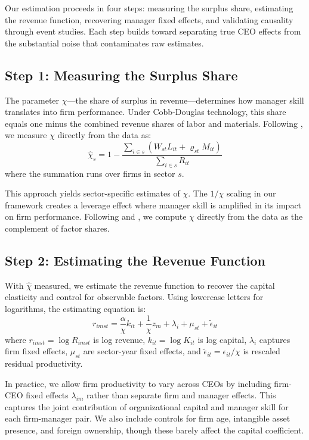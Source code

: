 \documentclass[11pt,a4paper]{article}
\begin{document}
Our estimation proceeds in four steps: measuring the surplus share, estimating the revenue function, recovering manager fixed effects, and validating causality through event studies. Each step builds toward separating true CEO effects from the substantial noise that contaminates raw estimates.

\subsection{Step 1: Measuring the Surplus Share}

The parameter $\chi$—the share of surplus in revenue—determines how manager skill translates into firm performance. Under Cobb-Douglas technology, this share equals one minus the combined revenue shares of labor and materials. Following \citet{Gandhi2020-nu}, we measure $\chi$ directly from the data as:
\begin{equation}
\hat{\chi}_s = 1 - \frac{\sum_{i \in s}(W_{st}L_{it} + \varrho_{st}M_{it})}{\sum_{i \in s} R_{it}}
\end{equation}
where the summation runs over firms in sector $s$.

This approach yields sector-specific estimates of $\chi$. The $1/\chi$ scaling in our framework creates a leverage effect where manager skill is amplified in its impact on firm performance. Following \citet{Halpern2015-se} and \citet{Gandhi2020-nu}, we compute $\chi$ directly from the data as the complement of factor shares.

\subsection{Step 2: Estimating the Revenue Function}

With $\hat{\chi}$ measured, we estimate the revenue function to recover the capital elasticity and control for observable factors. Using lowercase letters for logarithms, the estimating equation is:
\begin{equation}
r_{imst} = \frac{\alpha}{\chi} k_{it} + \frac{1}{\chi}z_m + \lambda_i + \mu_{st} + \tilde{\epsilon}_{it}
\end{equation}
where $r_{imst} = \log R_{imst}$ is log revenue, $k_{it} = \log K_{it}$ is log capital, $\lambda_i$ captures firm fixed effects, $\mu_{st}$ are sector-year fixed effects, and $\tilde{\epsilon}_{it} = \epsilon_{it}/\chi$ is rescaled residual productivity.

In practice, we allow firm productivity to vary across CEOs by including firm-CEO fixed effects $\lambda_{im}$ rather than separate firm and manager effects. This captures the joint contribution of organizational capital and manager skill for each firm-manager pair. We also include controls for firm age, intangible asset presence, and foreign ownership, though these barely affect the capital coefficient.
\end{document}
